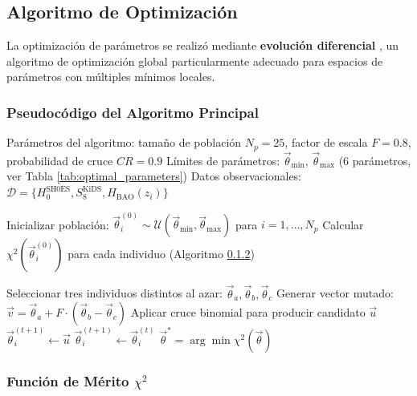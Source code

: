 \documentclass[12pt, a4paper]{article}
\theoremstyle{plain}
\theoremstyle{definition}
\begin{document}
\subsection{Algoritmo de Optimización}

La optimización de parámetros se realizó mediante \textbf{evolución diferencial} \cite{Storn1997}, un algoritmo de optimización global particularmente adecuado para espacios de parámetros con múltiples mínimos locales.

\subsubsection{Pseudocódigo del Algoritmo Principal}

\begin{algorithmic}[1]
\REQUIRE Parámetros del algoritmo: tamaño de población $N_p = 25$, factor de escala $F = 0.8$, probabilidad de cruce $CR = 0.9$
\REQUIRE Límites de parámetros: $\vec{\theta}_{\min}$, $\vec{\theta}_{\max}$ (6 parámetros, ver Tabla \ref{tab:optimal_parameters})
\REQUIRE Datos observacionales: $\mathcal{D} = \{H_0^{\text{SH0ES}}, S_8^{\text{KiDS}}, H_{\text{BAO}}(z_i)\}$

\STATE Inicializar población: $\vec{\theta}_i^{(0)} \sim \mathcal{U}(\vec{\theta}_{\min}, \vec{\theta}_{\max})$ para $i = 1,\dots,N_p$
\STATE Calcular $\chi^2(\vec{\theta}_i^{(0)})$ para cada individuo (Algoritmo \ref{alg:chi2})

        \STATE Seleccionar tres individuos distintos al azar: $\vec{\theta}_a, \vec{\theta}_b, \vec{\theta}_c$
        \STATE Generar vector mutado: $\vec{v} = \vec{\theta}_a + F \cdot (\vec{\theta}_b - \vec{\theta}_c)$
        \STATE Aplicar cruce binomial para producir candidato $\vec{u}$
            \STATE $\vec{\theta}_i^{(t+1)} \gets \vec{u}$ 
        \ELSE
            \STATE $\vec{\theta}_i^{(t+1)} \gets \vec{\theta}_i^{(t)}$ 
        \ENDIF
    \ENDFOR
        \BREAK {}
    \ENDIF
\ENDFOR
\RETURN $\vec{\theta}^* = \arg\min \chi^2(\vec{\theta})$ 
\end{algorithmic}

\subsubsection{Función de Mérito $\chi^2$}
\label{alg:chi2}
\end{document}
